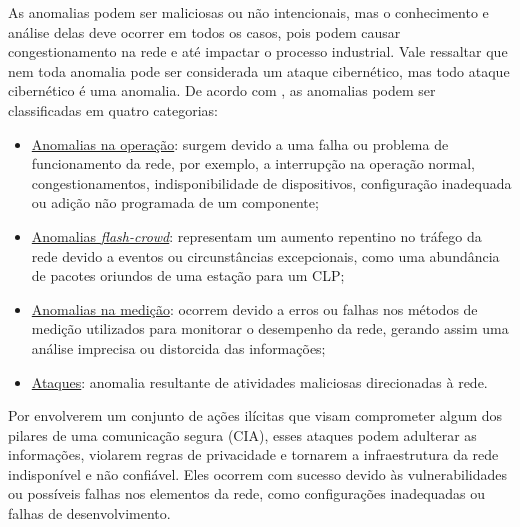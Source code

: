         As anomalias podem ser maliciosas ou não intencionais, mas o conhecimento e análise delas deve ocorrer em todos os casos, pois podem causar congestionamento na rede e até impactar o processo industrial. Vale ressaltar que nem toda anomalia pode ser considerada um ataque cibernético, mas todo ataque cibernético é uma anomalia. De acordo com \cite{barford2002}, as anomalias podem ser classificadas em quatro categorias:
            
        \begin{itemize}
            \item \underline{Anomalias na operação}: surgem devido a uma falha ou problema de funcionamento da rede, por exemplo, a interrupção na operação normal, congestionamentos, indisponibilidade de dispositivos, configuração inadequada ou adição não programada de um componente;
            \item \underline{Anomalias \textit{flash-crowd}}: representam um aumento repentino no tráfego da rede devido a eventos ou circunstâncias excepcionais, como uma abundância de pacotes oriundos de uma estação para um CLP;
            \item \underline{Anomalias na medição}: ocorrem devido a erros ou falhas nos métodos de medição utilizados para monitorar o desempenho da rede, gerando assim uma análise imprecisa ou distorcida das informações;
            \item \underline{Ataques}: anomalia resultante de atividades maliciosas direcionadas à rede.
        \end{itemize}


        Por envolverem um conjunto de ações ilícitas que visam comprometer algum dos pilares de uma comunicação segura (CIA), esses ataques podem adulterar as informações, violarem regras de privacidade e tornarem a infraestrutura da rede indisponível e não confiável. Eles ocorrem com sucesso devido às vulnerabilidades ou possíveis falhas nos elementos da rede, como configurações inadequadas ou falhas de desenvolvimento.


